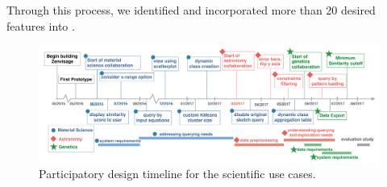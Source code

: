 Through this process, we identified and incorporated more than 20 desired features into \zv.
\begin{figure}[!ht]
	\centering
	\captionsetup{justification=centering,margin=2cm}
	\vspace{-10pt}
	\includegraphics[width=6in]{figures/timeline_new.pdf}
	\vspace{-6pt}\caption{Participatory design timeline for the scientific use cases.}
	\label{timeline}
	\vspace{-10pt}
\end{figure}
